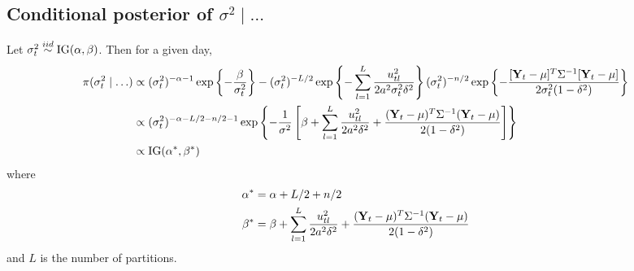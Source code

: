 \subsection*{Conditional posterior of $\sigma^2 \mid \ldots$}\label{s:sigpost}
Let $\sigma_t^2 \stackrel{iid}{\sim} \mbox{IG}(\alpha, \beta)$. Then for a given day,
\begin{align*}
    \pi(\sigma_t^2 \mid \ldots) & \propto (\sigma_t^2)^{-\alpha - 1} \exp \left\{ -\frac{ \beta}{ \sigma_t^2 } \right\} - (\sigma_t^2)^{ - L / 2 } \exp \left\{ - \sum_{ l = 1 }^{ L} \frac{ u_{tl}^2 }{ 2 a^2 \sigma_t^2 \delta^2 } \right\} (\sigma_t^2)^{-n/2} \exp \left\{ -\frac{ [\mbox{\bf Y}_t - \mu]^T \Sigma^{-1} [\mbox{\bf Y}_t - \mu] }{2 \sigma_t^2 (1 - \delta^2 ) }\right\} \\
    & \propto (\sigma_t^2)^{ -\alpha - L / 2 - n / 2 - 1} \exp \left\{ - \frac{ 1 }{ \sigma^2 } \left[\beta + \sum_{ l = 1 }^{ L}\frac{ u_{tl}^2 }{ 2 a^2 \delta^2} + \frac{ (\mbox{\bf Y}_t - \mu)^T \Sigma^{-1} (\mbox{\bf Y}_t - \mu) }{ 2 (1 - \delta^2)} \right] \right\} \\
    & \propto \mbox{IG} (\alpha^*, \beta^*)
\end{align*}
where
\begin{align*}
    \alpha^* &= \alpha + L / 2 + n / 2 \\
    \beta^* &= \beta + \sum_{ l = 1 }^{ L}\frac{ u_{tl}^2 }{ 2 a^2 \delta^2} + \frac{ (\mbox{\bf Y}_t - \mu)^T \Sigma^{-1} (\mbox{\bf Y}_t - \mu) }{ 2 (1 - \delta^2)}
\end{align*}
and $L$ is the number of partitions.